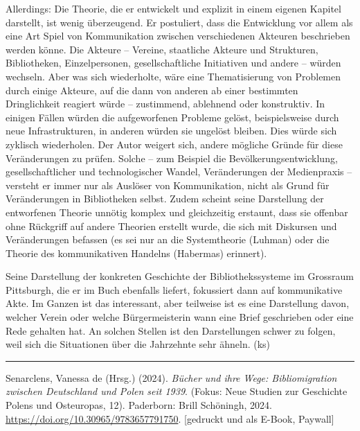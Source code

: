 \documentclass[a4paper,
fontsize=11pt,
oneside,
numbers=noperiodatend,
parskip=half-,
bibliography=totoc,
final
]{scrartcl}
\begin{document}
Allerdings: Die Theorie, die er entwickelt und explizit in einem eigenen
Kapitel darstellt, ist wenig überzeugend. Er postuliert, dass die
Entwicklung vor allem als eine Art Spiel von Kommunikation zwischen
verschiedenen Akteuren beschrieben werden könne. Die Akteure -- Vereine,
staatliche Akteure und Strukturen, Bibliotheken, Einzelpersonen,
gesellschaftliche Initiativen und andere -- würden wechseln. Aber was
sich wiederholte, wäre eine Thematisierung von Problemen durch einige
Akteure, auf die dann von anderen ab einer bestimmten Dringlichkeit
reagiert würde -- zustimmend, ablehnend oder konstruktiv. In einigen
Fällen würden die aufgeworfenen Probleme gelöst, beispielsweise durch
neue Infrastrukturen, in anderen würden sie ungelöst bleiben. Dies würde
sich zyklisch wiederholen. Der Autor weigert sich, andere mögliche
Gründe für diese Veränderungen zu prüfen. Solche -- zum Beispiel die
Bevölkerungsentwicklung, gesellschaftlicher und technologischer Wandel,
Veränderungen der Medienpraxis -- versteht er immer nur als Auslöser von
Kommunikation, nicht als Grund für Veränderungen in Bibliotheken selbst.
Zudem scheint seine Darstellung der entworfenen Theorie unnötig komplex
und gleichzeitig erstaunt, dass sie offenbar ohne Rückgriff auf andere
Theorien erstellt wurde, die sich mit Diskursen und Veränderungen
befassen (es sei nur an die Systemtheorie (Luhman) oder die Theorie des
kommunikativen Handelns (Habermas) erinnert).

Seine Darstellung der konkreten Geschichte der Bibliothekssysteme im
Grossraum Pittsburgh, die er im Buch ebenfalls liefert, fokussiert dann
auf kommunikative Akte. Im Ganzen ist das interessant, aber teilweise
ist es eine Darstellung davon, welcher Verein oder welche
Bürgermeisterin wann eine Brief geschrieben oder eine Rede gehalten hat.
An solchen Stellen ist den Darstellungen schwer zu folgen, weil sich die
Situationen über die Jahrzehnte sehr ähneln. (ks)

\begin{center}\rule{0.5\linewidth}{0.5pt}\end{center}

Senarclens, Vanessa de (Hrsg.) (2024). \emph{Bücher und ihre Wege:
Bibliomigration zwischen Deutschland und Polen seit 1939}. (Fokus: Neue
Studien zur Geschichte Polens und Osteuropas, 12). Paderborn: Brill
Schöningh, 2024. \url{https://doi.org/10.30965/9783657791750}.
{[}gedruckt und als E-Book, Paywall{]}
\end{document}

